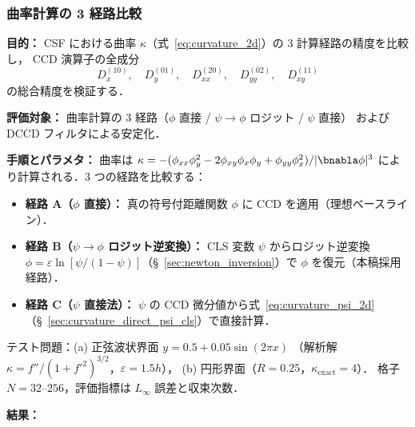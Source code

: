 \subsubsection{\texorpdfstring{曲率計算の 3 経路比較}{曲率計算の3経路比較}}
\label{sec:verify_curvature}

\noindent\textbf{目的：}
CSF における曲率 $\kappa$（式~\eqref{eq:curvature_2d}）の 3 計算経路の精度を比較し，
CCD 演算子の全成分
\[
  D_x^{(10)},\quad D_y^{(01)},\quad
  D_{xx}^{(20)},\quad D_{yy}^{(02)},\quad D_{xy}^{(11)}
\]
の総合精度を検証する．

\noindent\textbf{評価対象：}
曲率計算の 3 経路（$\phi$ 直接 / $\psi{\to}\phi$ ロジット / $\psi$ 直接）
および DCCD フィルタによる安定化．

\noindent\textbf{手順とパラメタ：}
曲率は
$\kappa = -(\phi_{xx}\phi_y^2 - 2\phi_{xy}\phi_x\phi_y + \phi_{yy}\phi_x^2)/|\bnabla\phi|^3$
により計算される．3 つの経路を比較する：
\begin{itemize}[noitemsep]
  \item \textbf{経路 A（$\phi$ 直接）：}
        真の符号付距離関数 $\phi$ に CCD を適用（理想ベースライン）．
  \item \textbf{経路 B（$\psi \to \phi$ ロジット逆変換）：}
        CLS 変数 $\psi$ からロジット逆変換
        $\phi = \varepsilon\ln[\psi/(1-\psi)]$（§~\ref{sec:newton_inversion}）で
        $\phi$ を復元（本稿採用経路）．
  \item \textbf{経路 C（$\psi$ 直接法）：}
        $\psi$ の CCD 微分値から式~\eqref{eq:curvature_psi_2d}
        （§~\ref{sec:curvature_direct_psi_cls}）で直接計算．
\end{itemize}
テスト問題：(a) 正弦波状界面 $y = 0.5 + 0.05\sin(2\pi x)$
（解析解 $\kappa = f''/(1+f'^2)^{3/2}$，$\varepsilon = 1.5h$），
(b) 円形界面（$R = 0.25$，$\kappa_\mathrm{exact} = 4$）．
格子 $N = 32$--$256$，評価指標は $L_\infty$ 誤差と収束次数．

\noindent\textbf{結果：}


